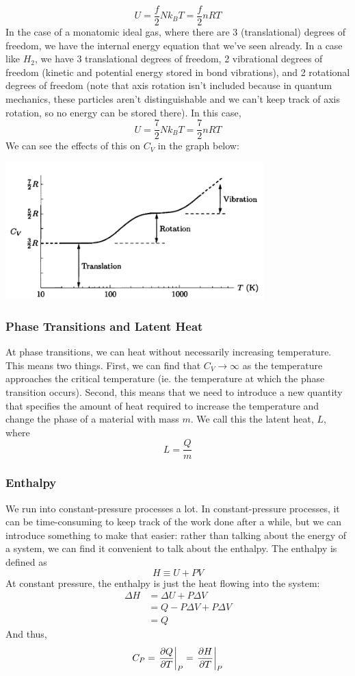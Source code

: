 \documentclass[a4paper]{article}
\begin{document}
\[
	U = \frac{f}{2} N k_B T = \frac{f}{2} nRT
\]
In the case of a monatomic ideal gas, where there are 3 (translational) degrees
of freedom, we have the internal energy equation that we've seen already. In a
case like $H_2$, we have 3 translational degrees of freedom, 2 vibrational
degrees of freedom (kinetic and potential energy stored in bond vibrations),
and 2 rotational degrees of freedom (note that axis rotation isn't included
because in quantum mechanics, these particles aren't distinguishable and we
can't keep track of axis rotation, so no energy can be stored there). In this
case,
\[
	U = \frac{7}{2} N k_B T = \frac{7}{2}nRT
\]
We can see the effects of this on $C_V$ in the graph below:
\begin{center}
	\includegraphics[width=0.75\textwidth]{HC_V.png}
\end{center}

\subsubsection{Phase Transitions and Latent Heat}
At phase transitions, we can heat without necessarily increasing temperature.
This means two things. First, we can find that $C_V \to \infty$ as the
temperature approaches the critical temperature (ie. the temperature at which
the phase transition occurs). Second, this means that we need to introduce a
new quantity that specifies the amount of heat required to increase the
temperature and change the phase of a material with mass $m$.
We call this the latent heat, $L$, where
\[
	L = \frac{Q}{m}
\]

\subsubsection{Enthalpy}
We run into constant-pressure processes a lot. In constant-pressure processes,
it can be time-consuming to keep track of the work done after a while, but we
can introduce something to make that easier: rather than talking about the
energy of a system, we can find it convenient to talk about the enthalpy. The
enthalpy is defined as
\[
	H \equiv U + PV
\]
At constant pressure, the enthalpy is just the heat flowing into the system:
\begin{align*}
	\Delta H &= \Delta U + P \Delta V\\
	&= Q - P\Delta V + P\Delta V\\
	&= Q
\end{align*}
And thus,
\[
	C_P = \left.\frac{\partial Q}{\partial T}\right|_P = \left.\frac{\partial H}{\partial T}\right|_P
\]
\end{document}
